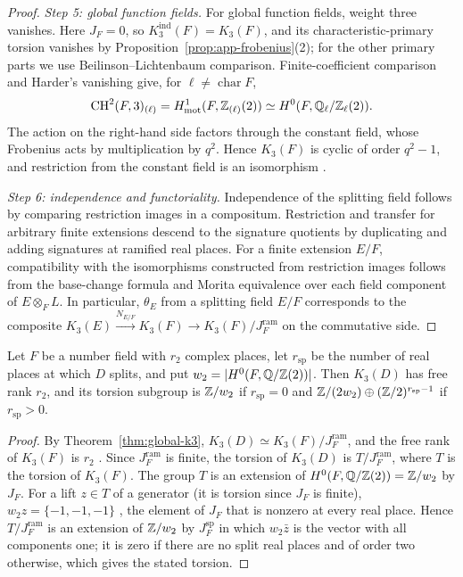 \begin{proof}
\emph{Step 5: global function fields.}
For global function fields, weight three vanishes.
Here $J_F=0$, so $K_3^{\mathrm{ind}}(F)=K_3(F)$, and its characteristic-primary torsion vanishes by Proposition~\ref{prop:app-frobenius}(2); for the other primary parts we use Beilinson--Lichtenbaum comparison.
Finite-coefficient comparison and Harder's vanishing give, for $\ell\ne\operatorname{char} F$,
\[
 \operatorname{CH}^2(F,3)_{(\ell)}
 = H^1_{\mathrm{mot}}(F,\mathbb Z_{(\ell)}(2))
 \simeq H^0(F,\mathbb Q_\ell/\mathbb Z_\ell(2)).
\]
The action on the right-hand side factors through the constant field, whose Frobenius acts by multiplication by $q^2$.
Hence $K_3(F)$ is cyclic of order $q^2-1$, and restriction from the constant field is an isomorphism \cite{Harder,QuillenFinite}.

\emph{Step 6: independence and functoriality.}
Independence of the splitting field follows by comparing restriction images in a compositum.
Restriction and transfer for arbitrary finite extensions descend to the signature quotients by duplicating and adding signatures at ramified real places.
For a finite extension $E/F$, compatibility with the isomorphisms constructed from restriction images follows from the base-change formula and Morita equivalence over each field component of $E\otimes_F L$.
In particular, $\theta_E$ from a splitting field $E/F$ corresponds to the composite $K_3(E)\xrightarrow{N_{E/F}}K_3(F)\to K_3(F)/J_{F}^{\mathrm{ram}}$ on the commutative side.
\end{proof}

\begin{corollary}\label{cor:global-k3-structure}
Let $F$ be a number field with $r_2$ complex places, let $r_{\mathrm{sp}}$ be the number of real places at which $D$ splits, and put $w_2=|H^0(F,\mathbb Q/\mathbb Z(2))|$.
Then $K_3(D)$ has free rank $r_2$, and its torsion subgroup is $\mathbb Z/w_2$ if $r_{\mathrm{sp}}=0$ and $\mathbb Z/(2w_2)\oplus(\mathbb Z/2)^{r_{\mathrm{sp}}-1}$ if $r_{\mathrm{sp}}>0$.
\end{corollary}
\begin{proof}
By Theorem~\ref{thm:global-k3}, $K_3(D)\simeq K_3(F)/J_F^{\mathrm{ram}}$, and the free rank of $K_3(F)$ is $r_2$ \cite{Borel}.
Since $J_F^{\mathrm{ram}}$ is finite, the torsion of $K_3(D)$ is $T/J_F^{\mathrm{ram}}$, where $T$ is the torsion of $K_3(F)$.
The group $T$ is an extension of $H^0(F,\mathbb Q/\mathbb Z(2))=\mathbb Z/w_2$ by $J_F$.
For a lift $z\in T$ of a generator (it is torsion since $J_F$ is finite), $w_2z=\{-1,-1,-1\}$ \cite[\S11]{MerkurjevSuslinK3}, the element of $J_F$ that is nonzero at every real place.
Hence $T/J_F^{\mathrm{ram}}$ is an extension of $\mathbb Z/w_2$ by $J_F^{\mathrm{sp}}$ in which $w_2\bar z$ is the vector with all components one; it is zero if there are no split real places and of order two otherwise, which gives the stated torsion.
\end{proof}

